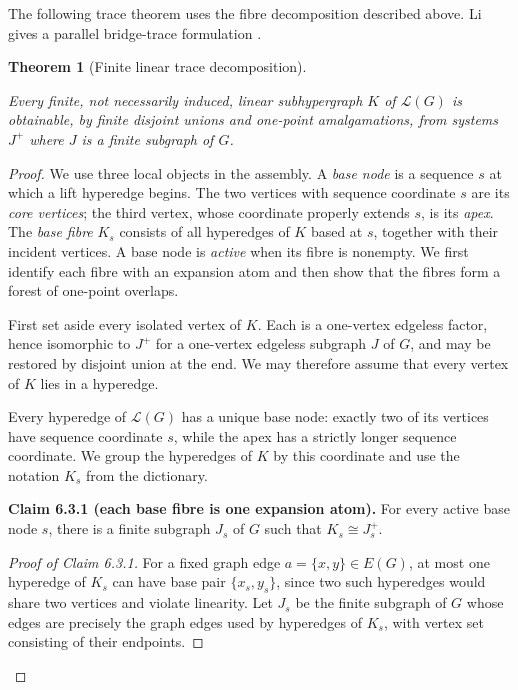 \documentclass[a4paper,11pt,reqno]{amsart}
\theoremstyle{plain}
\newtheorem{theorem}{Theorem}[section]
\theoremstyle{definition}
\theoremstyle{remark}
\begin{document}
The following trace theorem uses the fibre decomposition described above.
Li gives a parallel bridge-trace formulation \citep[Theorem~4.6]{li2026}.

\begin{theorem}[Finite linear trace decomposition]\label{theorem-6.3-exact-finite-linear-trace-theorem}

Every finite, not necessarily induced, linear subhypergraph \(K\) of
\(\mathcal L(G)\) is obtainable, by finite disjoint unions and one-point
amalgamations, from systems \(J^+\) where \(J\) is a finite subgraph of
\(G\).

\end{theorem}
\begin{proof}
We use three local objects in the assembly.  A \emph{base node} is a sequence
\(s\) at which a lift hyperedge begins.  The two vertices with sequence
coordinate \(s\) are its \emph{core vertices}; the third vertex, whose
coordinate properly extends \(s\), is its \emph{apex}.  The \emph{base fibre}
\(K_s\) consists of all hyperedges of \(K\) based at \(s\), together with
their incident vertices.  A base node is \emph{active} when its fibre is
nonempty.  We first identify each fibre with an expansion atom and then show
that the fibres form a forest of one-point overlaps.

First set aside every isolated vertex of \(K\). Each is a one-vertex edgeless
factor, hence isomorphic to \(J^+\) for a one-vertex edgeless subgraph \(J\)
of \(G\), and may be restored by disjoint union at the end. We may therefore
assume that every vertex of \(K\) lies in a hyperedge.

Every hyperedge of \(\mathcal L(G)\) has a unique base node: exactly two of
its vertices have sequence coordinate \(s\), while the apex has a strictly
longer sequence coordinate. We group the hyperedges of \(K\) by this
coordinate and use the notation \(K_s\) from the dictionary.

\medskip
\noindent\textbf{Claim 6.3.1 (each base fibre is one expansion atom).}
For every active base node \(s\), there is a finite subgraph \(J_s\) of
\(G\) such that \(K_s\cong J_s^+\).

\smallskip
\begin{proof}[Proof of Claim 6.3.1]

For a fixed graph edge \(a=\{x,y\}\in E(G)\), at most one hyperedge of \(K_s\) can have base pair \(\{x_s,y_s\}\), since two such hyperedges would share two vertices and violate linearity. Let \(J_s\) be the finite subgraph of \(G\) whose edges are precisely the graph edges used by hyperedges of \(K_s\), with vertex set consisting of their endpoints.


\end{proof}
\end{proof}
\end{document}
